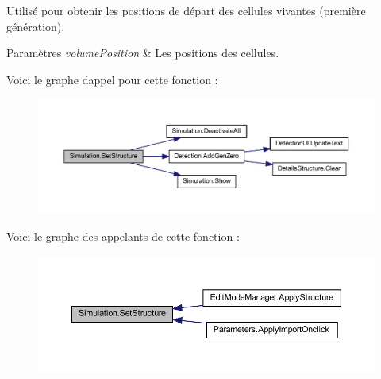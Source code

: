 Utilisé pour obtenir les positions de départ des cellules vivantes (première génération). 


\begin{DoxyParams}{Paramètres}
{\em volume\+Position} & Les positions des cellules.\\
\hline
\end{DoxyParams}
Voici le graphe d\textquotesingle{}appel pour cette fonction \+:
\nopagebreak
\begin{figure}[H]
\begin{center}
\leavevmode
\includegraphics[width=350pt]{class_simulation_a775498931843884fbc6c08de3b2b1afd_cgraph}
\end{center}
\end{figure}
Voici le graphe des appelants de cette fonction \+:
\nopagebreak
\begin{figure}[H]
\begin{center}
\leavevmode
\includegraphics[width=350pt]{class_simulation_a775498931843884fbc6c08de3b2b1afd_icgraph}
\end{center}
\end{figure}
\mbox{\label{class_simulation_af1580cd4ce5cb935c5f55ad4ce4f94de}} 

